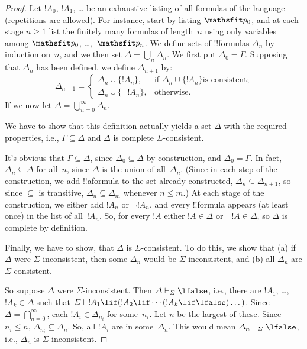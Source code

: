 \documentclass[../../../include/open-logic-section]{subfiles}
\begin{document}
\begin{proof}
Let $!A_0$, $!A_1$, \dots{} be an exhaustive listing of all formulas
of the language (repetitions are allowed). For instance, start by
listing $\Obj p_0$, and at each stage $n \ge 1$ list the finitely many
formulas of length~$n$ using only variables among $\Obj p_0$,
\dots,~$\Obj p_n$. We define sets of !!{formula}s $\Delta_n$ by
induction on~$n$, and we then set $\Delta = \bigcup_n \Delta_n$. We
first put $\Delta_0 = \Gamma$. Supposing that $\Delta_n$ has been
defined, we define $\Delta_{n+1}$ by:
\[
\Delta_{n+1} =
\begin{cases}
  \Delta_n \cup \{!A_n\}, & \text{if $\Delta_n \cup \{ !A_n\}$
    is consistent;} \\
  \Delta_n \cup \{ \lnot !A_n\}, & \text{otherwise.}
\end{cases}
\]
If we now let $\Delta = \bigcup_{n=0}^\infty \Delta_n$.

We have to show that this definition actually yields a set $\Delta$
with the required properties, i.e., $\Gamma \subseteq \Delta$ and
$\Delta$ is complete $\Sigma$-consistent.

It's obvious that $\Gamma \subseteq \Delta$, since $\Delta_0 \subseteq
\Delta$ by construction, and $\Delta_0 = \Gamma$. In fact, $\Delta_n
\subseteq \Delta$ for all~$n$, since $\Delta$ is the union of
all~$\Delta_n$. (Since in each step of the construction, we add
!!a{formula} to the set already constructed, $\Delta_n \subseteq
\Delta_{n+1}$, so since $\subseteq$ is transitive, $\Delta_n \subseteq
\Delta_{m}$ whenever $n \le m$.)  At each stage of the construction, we
either add $!A_n$ or $\lnot !A_n$, and every !!{formula} appears (at
least once) in the list of all~$!A_n$. So, for every $!A$ either $!A
\in \Delta$ or $\lnot !A \in \Delta$, so $\Delta$ is complete by
definition.

Finally, we have to show, that $\Delta$ is $\Sigma$-consistent.  To do
this, we show that (a) if $\Delta$ were $\Sigma$-inconsistent, then
some $\Delta_n$ would be $\Sigma$-inconsistent, and (b) all $\Delta_n$
are $\Sigma$-consistent.
  
So suppose $\Delta$ were $\Sigma$-inconsistent. Then $\Delta
\Proves[\Sigma] \lfalse$, i.e., there are $!A_1$, \dots,~$!A_k \in
\Delta$ such that $\Sigma \Proves !A_1 \lif (!A_2 \lif \cdots (!A_k
\lif \lfalse)\dots)$. Since $\Delta = \bigcap_{n=0}^\infty$, each
$!A_i \in \Delta_{n_i}$ for some~$n_i$. Let $n$ be the largest of
these. Since $n_i \le n$, $\Delta_{n_i} \subseteq \Delta_n$. So, all
$!A_i$ are in some~$\Delta_n$. This would mean $\Delta_n
\Proves[\Sigma] \lfalse$, i.e., $\Delta_n$ is $\Sigma$-inconsistent.


\end{proof}
\end{document}
